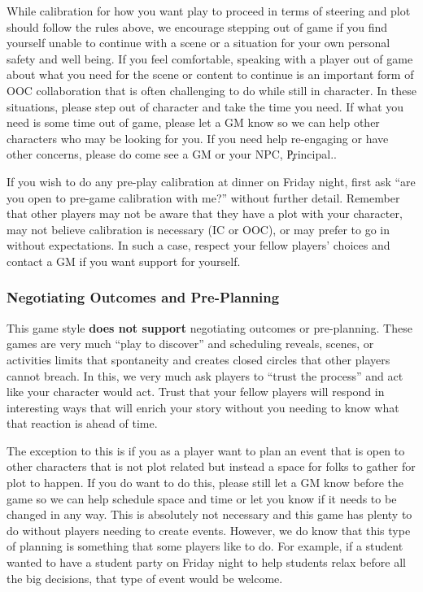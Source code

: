 \documentclass[sheet]{GL2020}
\begin{document}
While calibration for how you want play to proceed in terms of steering and plot should follow the rules above, we encourage stepping out of game if you find yourself unable to continue with a scene or a situation for your own personal safety and well being. If you feel comfortable, speaking with a player out of game about what you need for the scene or content to continue is an important form of OOC collaboration that is often challenging to do while still in character. In these situations, please step out of character and take the time you need. If what you need is some time out of game, please let a GM know so we can help other characters who may be looking for you. If you need help re-engaging or have other concerns, please do come see a GM or your NPC, \c{Principal}{}..

If you wish to do any pre-play calibration at dinner on Friday night, first ask ``are you open to pre-game calibration with me?'' without further detail. Remember that other players may not be aware that they have a plot with your character, may not believe calibration is necessary (IC or OOC), or may prefer to go in without expectations. In such a case, respect your fellow players' choices and contact a GM if you want support for yourself.

\subsubsection{Negotiating Outcomes and Pre-Planning}
This game style \textbf{does not support} negotiating outcomes or pre-planning. These games are very much ``play to discover'' and scheduling reveals, scenes, or activities limits that spontaneity and creates closed circles that other players cannot breach. In this, we very much ask players to ``trust the process'' and act like your character would act. Trust that your fellow players will respond in interesting ways that will enrich your story without you needing to know what that reaction is ahead of time.

The exception to this is if you as a player want to plan an event that is open to other characters that is not plot related but instead a space for folks to gather for plot to happen. If you do want to do this, please still let a GM know before the game so we can help schedule space and time or let you know if it needs to be changed in any way. This is absolutely not necessary and this game has plenty to do without players needing to create events. However, we do know that this type of planning is something that some players like to do. For example, if a student wanted to have a student party on Friday night to help students relax before all the big decisions, that type of event would be welcome.
\end{document}

